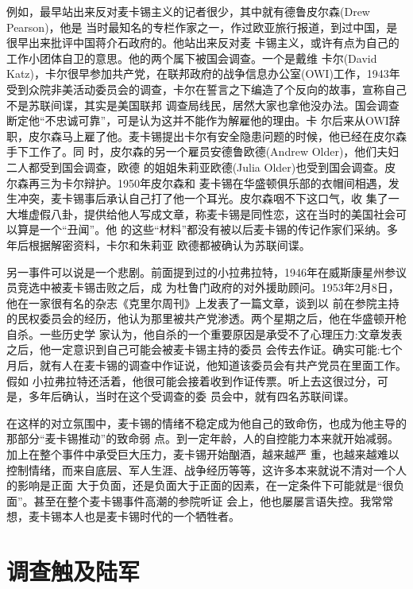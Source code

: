 \documentclass[10pt]{article}
\begin{document}
{例如，最早站出来反对麦卡锡主义的记者很少，其中就有德鲁\textperiodcentered 皮尔森(Drew Pearson)，他是
当时最知名的专栏作家之一，作过欧亚旅行报道，到过中国，是很早出来批评中国蒋介石政府的。他站出来反对麦
卡锡主义，或许有点为自己的工作小团体自卫的意思。他的两个属下被国会调查。一个是戴维
\textperiodcentered 卡尔(David Katz)，卡尔很早参加共产党，在联邦政府的战争信息办公室(OWI)工作，1943年
受到众院非美活动委员会的调查，卡尔在誓言之下编造了个反向的故事，宣称自己不是苏联间谍，其实是美国联邦
调查局线民，居然大家也拿他没办法。国会调查断定他``不忠诚可靠''，可是认为这并不能作为解雇他的理由。卡
尔后来从OWI辞职，皮尔森马上雇了他。麦卡锡提出卡尔有安全隐患问题的时候，他已经在皮尔森手下工作了。同
时，皮尔森的另一个雇员安德鲁\textperiodcentered 欧德(Andrew Older)，他们夫妇二人都受到国会调查，欧德
的姐姐朱莉亚\textperiodcentered 欧德(Julia Older)也受到国会调查。皮尔森再三为卡尔辩护。1950年皮尔森和
麦卡锡在华盛顿俱乐部的衣帽间相遇，发生冲突，麦卡锡事后承认自己打了他一个耳光。皮尔森咽不下这口气，收
集了一大堆虚假八卦，提供给他人写成文章，称麦卡锡是同性恋，这在当时的美国社会可以算是一个``丑闻''。他
的这些``材料''都没有被以后麦卡锡的传记作家们采纳。多年后根据解密资料，卡尔和朱莉亚
\textperiodcentered 欧德都被确认为苏联间谍。

另一事件可以说是一个悲剧。前面提到过的小拉弗拉特，1946年在威斯康星州参议员竞选中被麦卡锡击败之后，成
为杜鲁门政府的对外援助顾问。1953年2月8日，他在一家很有名的杂志《克里尔周刊》上发表了一篇文章，谈到以
前在参院主持的民权委员会的经历，他认为那里被共产党渗透。两个星期之后，他在华盛顿开枪自杀。一些历史学
家认为，他自杀的一个重要原因是承受不了心理压力:文章发表之后，他一定意识到自己可能会被麦卡锡主持的委员
会传去作证。确实可能:七个月后，就有人在麦卡锡的调查中作证说，他知道该委员会有共产党员在里面工作。假如
小拉弗拉特还活着，他很可能会接着收到作证传票。听上去这很过分，可是，多年后确认，当时在这个受调查的委
员会中，就有四名苏联间谍。

在这样的对立氛围中，麦卡锡的情绪不稳定成为他自己的致命伤，也成为他主导的那部分``麦卡锡推动''的致命弱
点。到一定年龄，人的自控能力本来就开始减弱。加上在整个事件中承受巨大压力，麦卡锡开始酗酒，越来越严
重，也越来越难以控制情绪，而来自底层、军人生涯、战争经历等等，这许多本来就说不清对一个人的影响是正面
大于负面，还是负面大于正面的因素，在一定条件下可能就是``很负面''。甚至在整个麦卡锡事件高潮的参院听证
会上，他也屡屡言语失控。我常常想，麦卡锡本人也是麦卡锡时代的一个牺牲者。


\pagebreak
\section{调查触及陆军}

}
\end{document}
